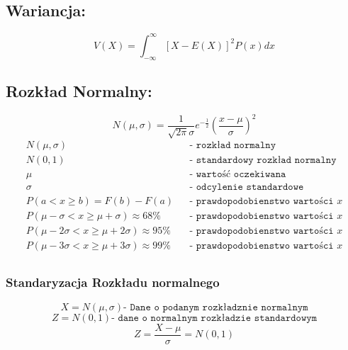 \documentclass[fleqn,a4paper]{article}
\begin{document}
\subsection{Wariancja:}
\[V(X)=\int_{-\infty}^{\infty}\left[X-E(X)\right]^2P(x)dx\]



\subsection{Rozkład Normalny:}
\[N(\mu,\sigma) =  \frac{1}{\sqrt{2\pi}\sigma}e^{-\frac{1}{2}} \left( \frac{x- \mu}{\sigma} \right)^2 \]
\begin{align*}
N(\mu,\sigma)&&\texttt{- rozkład normalny}\\
N(0,1)& &\texttt{- standardowy rozkład normalny}\\
\mu& &\texttt{- wartość oczekiwana}\\
\sigma& &\texttt{- odcylenie standardowe}\\
P(a < x \geq b) = F(b)-F(a)& &\texttt{- prawdopodobienstwo wartości }x\\
P(\mu -\sigma < x \geq \mu+\sigma) \approx 68\%& &\texttt{- prawdopodobienstwo wartości }x  \\
P(\mu -2\sigma < x \geq \mu+2\sigma) \approx 95\%& &\texttt{- prawdopodobienstwo wartości }x \\
P(\mu -3\sigma < x \geq \mu+3\sigma) \approx 99\%& &\texttt{- prawdopodobienstwo wartości }x \\
\end{align*}

\subsubsection{Standaryzacja Rozkładu normalnego}
\[X = N(\mu,\sigma) \texttt{- Dane o podanym rozkładznie normalnym}\]
\[Z = N(0,1) \texttt{- dane o normalnym rozkładzie standardowym}\]
\[Z = \frac{X-\mu}{\sigma} = N(0,1) \]
\end{document}
